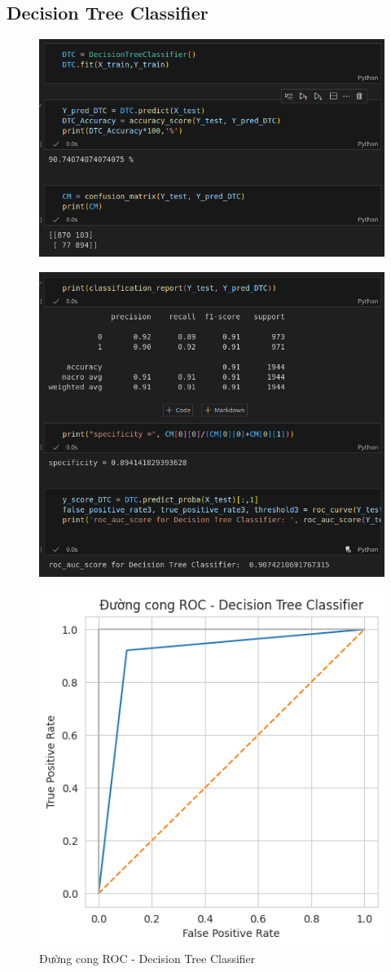 \documentclass[11pt]{article}
\begin{document}
	\subsection{Decision Tree Classifier}
	
	\begin{figure}[H]
		\centering
		\includegraphics[width=0.7\linewidth]{DecisionTreeClassifier/screenshot004}
		\caption{}
		\label{fig:screenshot004}
	\end{figure}
	
	\begin{figure}[H]
		\centering
		\includegraphics[width=0.7\linewidth]{DecisionTreeClassifier/screenshot005}
		\caption{}
		\label{fig:screenshot005}
	\end{figure}
	
	\begin{figure}[H]
		\centering
		\includegraphics[width=0.7\linewidth]{DecisionTreeClassifier/DuongCongROC}
		\caption{Đường cong ROC - Decision Tree Classifier}
		\label{fig:duongcongroc}
	\end{figure}
	
\end{document}
